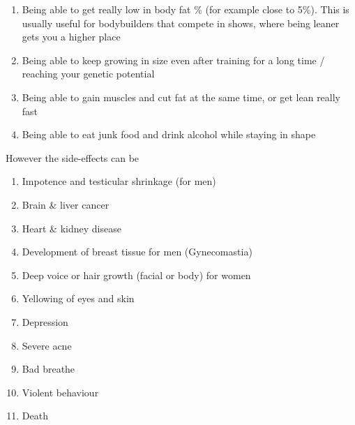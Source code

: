 \documentclass[openany, 12pt]{book}
\begin{document}
	\begin{enumerate}
		\item Being able to get really low in body fat \% (for example close to 5\%). This is usually useful for bodybuilders that compete in shows, where being leaner gets you a higher place
		\item Being able to keep growing in size even after training for a long time / reaching your genetic potential
		\item Being able to gain muscles and cut fat at the same time, or get lean really fast
		\item Being able to eat junk food and drink alcohol while staying in shape
	\end{enumerate}

        However the side-effects can be

	\begin{enumerate}
		\item Impotence and testicular shrinkage (for men)
		\item Brain \& liver cancer
		\item Heart \& kidney disease
		\item Development of breast tissue for men (Gynecomastia)
		\item Deep voice or hair growth (facial or body) for women
		\item Yellowing of eyes and skin
		\item Depression
		\item Severe acne
		\item Bad breathe
		\item Violent behaviour
		\item Death
	\end{enumerate}
\end{document}
